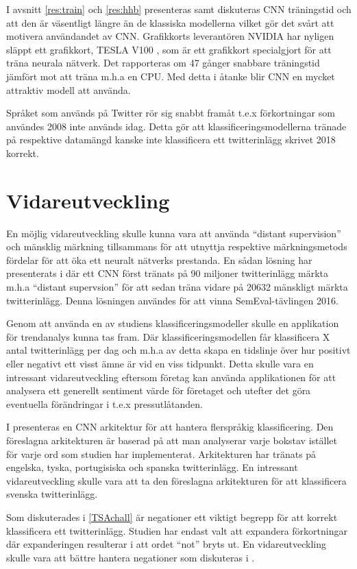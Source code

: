 \documentclass{kaumasters} %
\begin{document}
I avsnitt \ref{res:train} och \ref{res:hhb} presenteras samt diskuteras CNN träningstid och att den är väsentligt längre än de klassiska modellerna vilket gör det svårt att motivera användandet av CNN. Grafikkorts leverantören NVIDIA har nyligen släppt ett grafikkort, TESLA V100 \cite{slut:002}, som är ett grafikkort specialgjort för att träna neurala nätverk. Det rapporteras om 47 gånger snabbare träningstid jämfört mot att träna m.h.a en CPU. Med detta i åtanke blir CNN en mycket attraktiv modell att använda. 

Språket som används på Twitter rör sig snabbt framåt t.e.x förkortningar som användes 2008 inte används idag. Detta gör att klassificeringsmodellerna tränade på respektive datamängd kanske inte klassificera ett twitterinlägg skrivet 2018 korrekt. 
\section{Vidareutveckling} \label{slut:fw}
En möjlig vidareutveckling skulle kunna vara att använda “distant supervision” och mänsklig märkning tillsammans för att utnyttja respektive märkningsmetods fördelar för att öka ett neuralt nätverks prestanda. En sådan lösning har presenterats i \cite{slut:004} där ett CNN först tränats på 90 miljoner twitterinlägg märkta m.h.a “distant supervsion” för att sedan träna vidare på 20632 mänskligt märkta twitterinlägg. Denna lösningen användes för att vinna SemEval-tävlingen 2016. 

Genom att använda en av studiens klassificeringsmodeller skulle en applikation för trendanalys kunna tas fram. Där klassificeringsmodellen får klassificera X antal twitterinlägg per dag och m.h.a av detta skapa en tidslinje över hur positivt eller negativt ett visst ämne är vid en viss tidpunkt. Detta skulle vara en intressant vidareutveckling eftersom företag kan använda applikationen för att analysera ett generellt sentiment värde för företaget och utefter det göra eventuella förändringar i t.e.x pressutlåtanden.

I \cite{slut:001} presenteras en CNN arkitektur för att hantera flerspråkig klassificering. Den föreslagna arkitekturen är baserad på att man analyserar varje bokstav istället för varje ord som studien har implementerat. Arkitekturen har tränats på engelska, tyska, portugisiska och spanska twitterinlägg. En intressant vidareutveckling skulle vara att ta den föreslagna arkitekturen för att klassificera svenska twitterinlägg.

Som diskuterades i \ref{TSAchall} är negationer ett viktigt begrepp för att korrekt klassificera ett twitterinlägg. Studien har endast valt att expandera förkortningar där expanderingen resulterar i att ordet “not” bryts ut. En vidareutveckling skulle vara att bättre hantera negationer som diskuteras i \cite{TSAsurvey, effrosynidis2017comparison}.
\end{document}
